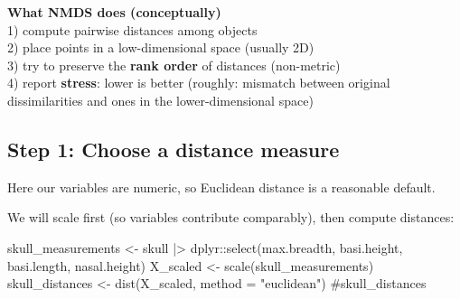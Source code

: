 \documentclass[
  letterpaper,
  8pt,
  a4paper]{book}
\newenvironment{Shaded}{\begin{snugshade}}{\end{snugshade}}
\newcommand{\AttributeTok}[1]{\textcolor[rgb]{0.40,0.45,0.13}{#1}}
\newcommand{\CommentTok}[1]{\textcolor[rgb]{0.37,0.37,0.37}{#1}}
\newcommand{\FunctionTok}[1]{\textcolor[rgb]{0.28,0.35,0.67}{#1}}
\newcommand{\NormalTok}[1]{\textcolor[rgb]{0.00,0.23,0.31}{#1}}
\newcommand{\OtherTok}[1]{\textcolor[rgb]{0.00,0.23,0.31}{#1}}
\newcommand{\SpecialCharTok}[1]{\textcolor[rgb]{0.37,0.37,0.37}{#1}}
\newcommand{\StringTok}[1]{\textcolor[rgb]{0.13,0.47,0.30}{#1}}
\begin{document}
\begin{tcolorbox}[enhanced jigsaw, arc=.35mm, bottomrule=.15mm, bottomtitle=1mm, breakable, colback=white, colbacktitle=quarto-callout-important-color!10!white, colframe=quarto-callout-important-color-frame, coltitle=black, left=2mm, leftrule=.75mm, opacityback=0, opacitybacktitle=0.6, rightrule=.15mm, title=\textcolor{quarto-callout-important-color}{\faExclamation}\hspace{0.5em}{Important}, titlerule=0mm, toprule=.15mm, toptitle=1mm]

\textbf{What NMDS does (conceptually)}\\
1) compute pairwise distances among objects\\
2) place points in a low-dimensional space (usually 2D)\\
3) try to preserve the \textbf{rank order} of distances (non-metric)\\
4) report \textbf{stress}: lower is better (roughly: mismatch between
original dissimilarities and ones in the lower-dimensional space)

\end{tcolorbox}

\subsection*{Step 1: Choose a distance
measure}\label{step-1-choose-a-distance-measure}

Here our variables are numeric, so Euclidean distance is a reasonable
default.

We will scale first (so variables contribute comparably), then compute
distances:

\begin{Shaded}
\begin{Highlighting}[]
\NormalTok{skull\_measurements }\OtherTok{\textless{}{-}}\NormalTok{ skull }\SpecialCharTok{|\textgreater{}}
\NormalTok{  dplyr}\SpecialCharTok{::}\FunctionTok{select}\NormalTok{(max.breadth, basi.height, basi.length, nasal.height)}
\NormalTok{X\_scaled }\OtherTok{\textless{}{-}} \FunctionTok{scale}\NormalTok{(skull\_measurements)}
\NormalTok{skull\_distances }\OtherTok{\textless{}{-}} \FunctionTok{dist}\NormalTok{(X\_scaled, }\AttributeTok{method =} \StringTok{"euclidean"}\NormalTok{)}
\CommentTok{\#skull\_distances}
\end{Highlighting}
\end{Shaded}
\end{document}
